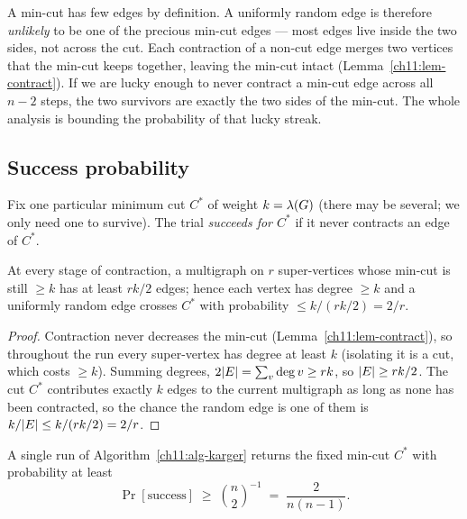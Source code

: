 \begin{intuitionbox}
A min-cut has few edges by definition. A uniformly random edge is therefore \emph{unlikely} to be one of the precious min-cut edges --- most edges live inside the two sides, not across the cut. Each contraction of a non-cut edge merges two vertices that the min-cut keeps together, leaving the min-cut intact (Lemma~\ref{ch11:lem-contract}). If we are lucky enough to never contract a min-cut edge across all $n-2$ steps, the two survivors are exactly the two sides of the min-cut. The whole analysis is bounding the probability of that lucky streak.
\end{intuitionbox}

\subsection{Success probability}

Fix one particular minimum cut $C^\ast$ of weight $k=\lambda(G)$ (there may be several; we only need one to survive). The trial \emph{succeeds for $C^\ast$} if it never contracts an edge of $C^\ast$.

\begin{lemma}\label{ch11:lem-mindeg}
At every stage of contraction, a multigraph on $r$ super-vertices whose min-cut is still $\ge k$ has at least $rk/2$ edges; hence each vertex has degree $\ge k$ and a uniformly random edge crosses $C^\ast$ with probability $\le k/(rk/2)=2/r$.
\end{lemma}

\begin{proof}
Contraction never decreases the min-cut (Lemma~\ref{ch11:lem-contract}), so throughout the run every super-vertex has degree at least $k$ (isolating it is a cut, which costs $\ge k$). Summing degrees, $2\lvert E\rvert=\sum_v \deg v \ge rk$, so $\lvert E\rvert\ge rk/2$. The cut $C^\ast$ contributes exactly $k$ edges to the current multigraph as long as none has been contracted, so the chance the random edge is one of them is $k/\lvert E\rvert \le k/(rk/2)=2/r$.
\end{proof}

\begin{theorem}\label{ch11:thm-karger}
A single run of Algorithm~\ref{ch11:alg-karger} returns the fixed min-cut $C^\ast$ with probability at least
\[
  \Pr[\text{success}] \;\ge\; \binom{n}{2}^{-1} \;=\; \frac{2}{n(n-1)}.
\]
\end{theorem}


